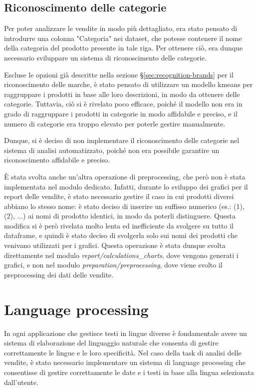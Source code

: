 \subsection{Riconoscimento delle categorie}
\label{sec:recognition-categories}

Per poter analizzare le vendite in modo più dettagliato, era stato pensato di introdurre una colonna "Categoria" nei dataset, che potesse contenere il nome della categoria del prodotto presente in tale riga. Per ottenere ciò, era dunque necessario sviluppare un sistema di riconoscimento delle categorie.

Escluse le opzioni già descritte nella sezione \S\ref{sec:recognition-brands} per il riconoscimento delle marche, è stato pensato di utilizzare un modello \gls{kmeans}{} per raggruppare i prodotti in base alle loro descrizioni, in modo da ottenere delle categorie. Tuttavia, ciò si è rivelato poco efficace, poiché il modello non era in grado di raggruppare i prodotti in categorie in modo affidabile e preciso, e il numero di categorie era troppo elevato per poterle gestire manualmente.

Dunque, si è deciso di non implementare il riconoscimento delle categorie nel sistema di analisi automatizzato, poiché non era possibile garantire un riconoscimento affidabile e preciso.


È stata svolta anche un'altra operazione di preprocessing, che però non è stata implementata nel modulo dedicato.
Infatti, durante lo sviluppo dei grafici per il report delle vendite, è stato necessario gestire il caso in cui prodotti diversi abbiano lo stesso nome: è stato deciso di inserire un suffisso numerico (es.: (1), (2), ...) ai nomi di prodotto identici, in modo da poterli distinguere. Questa modifica si è però rivelata molto lenta ed inefficiente da svolgere su tutto il dataframe, e quindi è stato deciso di svolgerla solo sui nomi dei prodotti che venivano utilizzati per i grafici.
Questa operazione è stata dunque svolta direttamente nel modulo \emph{report/calculations\_charts}, dove vengono generati i grafici, e non nel modulo \emph{preparation/preprocessing}, dove viene svolto il preprocessing dei dati delle vendite.



\section{Language processing}
\label{sec:language-processing}

In ogni applicazione che gestisce testi in lingue diverse è fondamentale avere un sistema di elaborazione del linguaggio naturale che consenta di gestire correttamente le lingue e le loro specificità. Nel caso della task di analisi delle vendite, è stato necessario implementare un sistema di language processing che consentisse di gestire correttamente le date e i testi in base alla lingua selezionata dall'utente.

